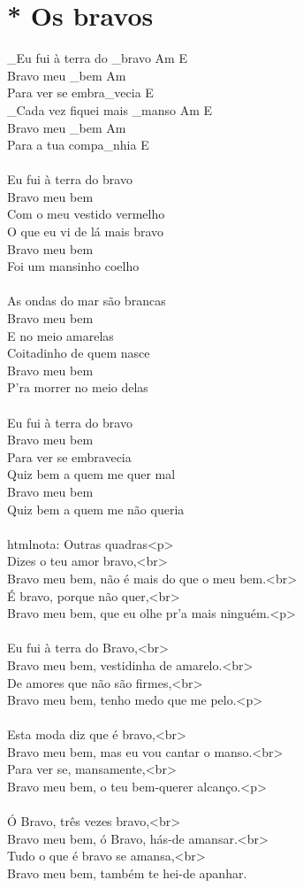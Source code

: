 \documentclass{article}
\begin{document}
\section{ * Os bravos}
_Eu fui à terra do _bravo   Am E\\
Bravo meu _bem           Am\\
Para ver se embra_vecia   E\\
_Cada vez fiquei mais _manso   Am E\\
Bravo meu _bem  Am\\
Para a tua compa_nhia   E\\
\\
Eu fui à terra do bravo\\
Bravo meu bem \\
Com o meu vestido vermelho\\
O que eu vi de lá mais bravo\\
Bravo meu bem\\
Foi um mansinho coelho\\
\\
As ondas do mar são brancas\\
Bravo meu bem\\
E no meio amarelas\\
Coitadinho de quem nasce\\
Bravo meu bem\\
P'ra morrer no meio delas\\
\\
Eu fui à terra do bravo\\
Bravo meu bem\\
Para ver se embravecia\\
Quiz bem a quem me quer mal\\
Bravo meu bem\\
Quiz bem a quem me não queria\\
\\
htmlnota: Outras quadras<p>\\
Dizes o teu amor bravo,<br>\\
Bravo meu bem, não é mais do que o meu bem.<br>\\
É bravo, porque não quer,<br>\\
Bravo meu bem, que eu olhe pr'a mais ninguém.<p>\\
\\
Eu fui à terra do Bravo,<br>\\
Bravo meu bem, vestidinha de amarelo.<br>\\
De amores que não são firmes,<br>\\
Bravo meu bem, tenho medo que me pelo.<p>\\
\\
Esta moda diz que é bravo,<br>\\
Bravo meu bem, mas eu vou cantar o manso.<br>\\
Para ver se, mansamente,<br>\\
Bravo meu bem, o teu bem-querer alcanço.<p>\\
\\
Ó Bravo, três vezes bravo,<br>\\
Bravo meu bem, ó Bravo, hás-de amansar.<br>\\
Tudo o que é bravo se amansa,<br>\\
Bravo meu bem, também te hei-de apanhar.\\
\end{document}
